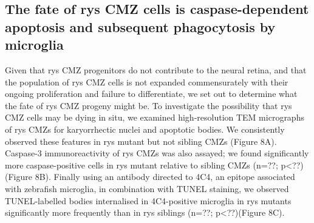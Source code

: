 \subsection{The fate of rys CMZ cells is caspase-dependent apoptosis and subsequent phagocytosis by microglia}
Given that rys CMZ progenitors do not contribute to the neural retina, and that the population of rys CMZ cells is not expanded commensurately with their ongoing proliferation and failure to differentiate, we set out to determine what the fate of rys CMZ progeny might be. To investigate the possibility that rys CMZ cells may be dying in situ, we examined high-resolution TEM micrographs of rys CMZs for karyorrhectic nuclei and apoptotic bodies. We consistently observed these features in rys mutant but not sibling CMZs (Figure 8A). Caspase-3 immunoreactivity of rys CMZs was also assayed; we found significantly more caspase-positive cells in rys mutant relative to sibling CMZs (n=??; p<??)(Figure 8B). Finally using an antibody directed to 4C4, an epitope associated with zebrafish microglia, in combination with TUNEL staining, we observed TUNEL-labelled bodies internalised in 4C4-positive microglia in rys mutants significantly more frequently than in rys siblings (n=??; p<??)(Figure 8C).

